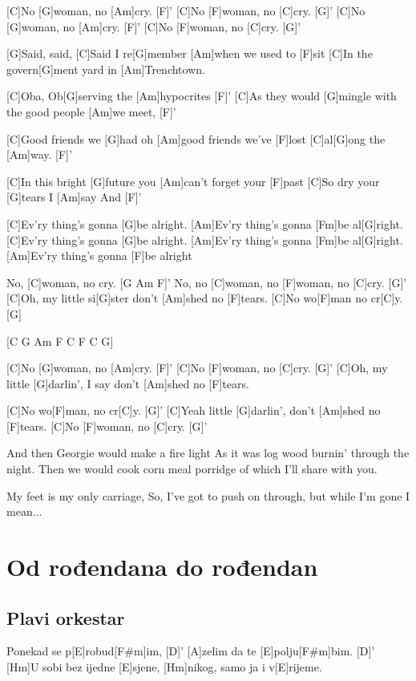 \documentclass[a4paper,12pt]{article}
\begin{document}
\begin{multicols}{2}
\begin{guitar}
[G  C  G  Am7  F  C  F  C  G]


[C]No [G]woman, no [Am]cry. [F]'
[C]No [F]woman, no [C]cry.  [G]'
[C]No [G]woman, no [Am]cry. [F]'
[C]No [F]woman, no [C]cry. [G]'


[G]Said, said,
[C]Said I re[G]member [Am]when we used to [F]sit
[C]In the govern[G]ment yard in [Am]Trenchtown.


[C]Oba, Ob[G]serving the [Am]hypocrites [F]'
[C]As they would [G]mingle
with the good people [Am]we meet, [F]'


[C]Good friends we [G]had oh 
[Am]good friends we've [F]lost
[C]al[G]ong the [Am]way. [F]'


[C]In this bright [G]future 
you [Am]can't forget your [F]past
[C]So dry your [G]tears I [Am]say And [F]'
  

[C]Ev'ry thing's gonna [G]be alright. 
[Am]Ev'ry thing's gonna [Fm]be al[G]right.
[C]Ev'ry thing's gonna [G]be alright.  
[Am]Ev'ry thing's gonna [Fm]be al[G]right.
[Am]Ev'ry thing's gonna [F]be alright 


No, [C]woman, no cry. [G  Am  F]'
No, no [C]woman, no [F]woman, no [C]cry. [G]'
[C]Oh, my little si[G]ster don't [Am]shed no [F]tears.
[C]No wo[F]man no cr[C]y. [G]


[C   G   Am   F   C   F   C   G]


[C]No [G]woman, no [Am]cry. [F]'
[C]No [F]woman, no [C]cry. [G]'
[C]Oh, my little [G]darlin', 
I say don't [Am]shed no [F]tears.


[C]No wo[F]man, no cr[C]y. [G]'
[C]Yeah little [G]darlin', 
don't [Am]shed no [F]tears.
[C]No [F]woman, no [C]cry. [G]'


And then Georgie would make a fire light
As it was log wood burnin' through the night.
Then we  would cook corn meal porridge
of which I'll share with you.


My feet is my only carriage,
So, I've got to push on through, 
but while I'm gone I mean...

\end{guitar}
\section{Od rođendana do rođendan}
\subsection*{Plavi orkestar}
\begin{guitar}
[A]Ponekad se p[E]robud[F#m]im, [D]'
[A]zelim da te [E]polju[F#m]bim.  [D]'
[Hm]U sobi bez ijedne [E]sjene,
[Hm]nikog, samo ja i v[E]rijeme.



\end{guitar}
\end{multicols}
\end{document}
